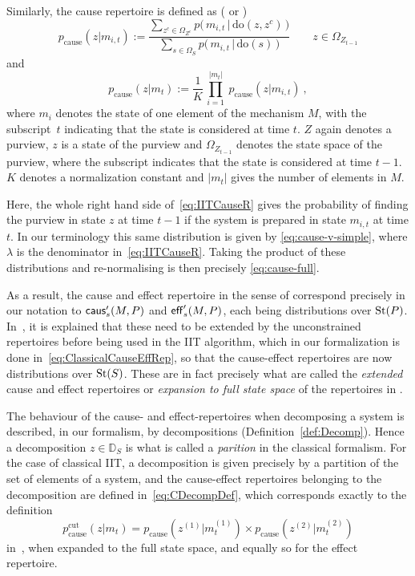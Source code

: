 Similarly, the cause repertoire is defined as (\cite[p.\,14]{marshall2016integrated} or \cite{tononi.2015.scholarpedia})
\begin{equation}\label{eq:IITCauseR}
p_{\textrm{cause}} (z | m_{i,t} ) := \frac{\sum_{z^c \in \Omega_{Z^c}} p\big(\, m_{i,t} \, | \, \textrm{do}(z,z^c) \,  \big) }{\sum_{s \in \Omega_S} p\big(\,m_{i,t} \, | \, \textrm{do}(s) \, \big)} \qquad z \in \Omega_{Z_{t-1}} 
\end{equation}
and
\begin{equation}\label{eq:IITCauseR2}
p_{\textrm{cause}} (z | m_t ) := \frac{1}{K} \, \prod_{i=1}^{|m_t|} \ p_{\textrm{cause}} (z | m_{i,t} ) \:,
\end{equation}
where $m_i$ denotes the state of one element of the mechanism $M$, with the subscript~$t$ indicating that the state is considered at time $t$. $Z$ again denotes a purview, $z$ is a state of the purview and $\Omega_{Z_{t-1}}$ denotes the state space of the purview, where the subscript indicates that the state is considered at time $t-1$. $K$ denotes a normalization constant and $|m_t|$ gives the number of elements in $M$.

Here, the whole right hand side of~\eqref{eq:IITCauseR} gives the probability of finding the purview in state $z$ at time $t-1$ if the system is prepared in state $m_{i,t}$ at time $t$. In our terminology this same distribution is given by \eqref{eq:cause-v-simple},
where $\lambda$ is the denominator in~\eqref{eq:IITCauseR}. Taking the product of these distributions and re-normalising is then precisely \eqref{eq:cause-full}.

As a result, the cause and effect repertoire in the sense of \cite{oizumi2014phenomenology} correspond precisely in our notation to $\mathsf{caus}'_s(M,P)$ and $\mathsf{eff}'_s(M,P)$, each being distributions over $\text{St}(P)$.
In~\cite[S1]{mayner2018pyphi}, it is explained that these need to be extended by the unconstrained repertoires before being used in the IIT algorithm, which in our formalization is done in~\eqref{eq:ClassicalCauseEffRep}, so that the cause-effect repertoires are now distributions over $\text{St}(S)$.
These are in fact precisely what are called the \emph{extended} cause and effect repertoires or \emph{expansion to full state space} of the repertoires in \cite{oizumi2014phenomenology}.

The behaviour of the cause- and effect-repertoires when decomposing a system is described, in our formalism, by decompositions (Definition~\ref{def:Decomp}). Hence a decomposition $z \in \mathbb D_S$ is what is called a \emph{parition} in the classical formalism. For the case of classical IIT, a decomposition is given precisely by a partition of the set of elements of a system, and the cause-effect repertoires belonging to the decomposition are defined in~\eqref{eq:CDecompDef}, which corresponds exactly to the definition
\[
p_{\textrm{cause}}^{\textrm{cut}} (z | m_t) = p_{\textrm{cause}}(z^{(1)} | m_t^{(1)}) \times  p_{\textrm{cause}}(z^{(2)} | m_t^{(2)})
\]
in~\cite{marshall2016integrated}, when expanded to the full state space, and equally so for the effect repertoire.

